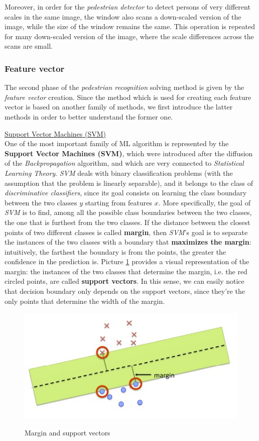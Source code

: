 Moreover, in order for the \textit{pedestrian detector} to detect persons of very different scales in the same image, the window also scans a down-scaled version of the image, while the size of the window remains the same. This operation is repeated for many down-scaled version of the image, where the scale differences across the scans are small.

\subsubsection{Feature vector}
The second phase of the \textit{pedestrian recognition} solving method is given by the \textit{feature vector} creation. Since the method which is used for creating each feature vector is based on another family of methods, we first introduce the latter methods in order to better understand the former one.

\underline{Support Vector Machines (SVM)}
\\
One of the most important family of ML algorithm is represented by the \textbf{Support Vector Machines (SVM)}, which were introduced after the diffusion of the \textit{Backpropagation} algorithm, and which are very connected to \textit{Statistical Learning Theory}. \textit{SVM} deals with 
binary classification problems (with the assumption that the problem is linearly separable), and it belongs to the class of \textit{discriminative classifiers}, since its goal consists on learning the class boundary between the two classes $y$ starting from features $x$. More specifically, the goal of \textit{SVM} is to find, among all the possible class boundaries between the two classes, the one that is furthest from the two classes. If the distance between the closest points of two different classes is called \textbf{margin}, then \textit{SVM}'s goal is to separate the instances of the two classes with a boundary that \textbf{maximizes the margin}: intuitively, the farthest the boundary is from the points, the greater the confidence in the prediction is. Picture \ref{margin} provides a visual representation of the margin: the instances of the two classes that determine the margin, i.e. the red circled points, are called \textbf{support vectors}. In this sense, we can easily notice that decision boundary only depends on the support vectors, since they're the only points that determine the width of the margin. 

\begin{figure}[h!]
		\centering
		\includegraphics[scale = 1.5]{img/margin.jpg}
        \label{margin}
        \caption{Margin and support vectors}
\end{figure}

